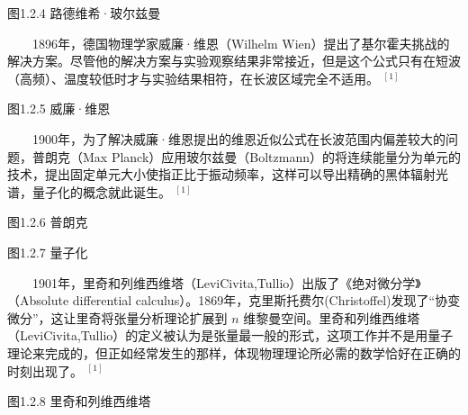 \documentclass[a4paper,11pt,english]{sphinxmanual}
\begin{document}
\begin{center}图1.2.4 路德维希·玻尔兹曼
\end{center}
\sphinxAtStartPar
  1896年，德国物理学家威廉·维恩（Wilhelm Wien）提出了基尔霍夫挑战的解决方案。尽管他的解决方案与实验观察结果非常接近，但是这个公式只有在短波（高频）、温度较低时才与实验结果相符，在长波区域完全不适用。 \(^{[1]}\)


\begin{center}图1.2.5 威廉·维恩
\end{center}
\sphinxAtStartPar
  1900年，为了解决威廉·维恩提出的维恩近似公式在长波范围内偏差较大的问题，普朗克（Max Planck）应用玻尔兹曼（Boltzmann）的将连续能量分为单元的技术，提出固定单元大小使指正比于振动频率，这样可以导出精确的黑体辐射光谱，量子化的概念就此诞生。 \(^{[1]}\)


\begin{center}图1.2.6 普朗克
\end{center}

\begin{center}图1.2.7 量子化
\end{center}
\sphinxAtStartPar
  1901年，里奇和列维\sphinxhyphen{}西维塔（Levi\sphinxhyphen{}Civita,Tullio）出版了《绝对微分学》（Absolute differential calculus）。1869年，克里斯托费尔(Christoffel)发现了“协变微分”，这让里奇将张量分析理论扩展到 \(n\) 维黎曼空间。里奇和列维\sphinxhyphen{}西维塔（Levi\sphinxhyphen{}Civita,Tullio）的定义被认为是张量最一般的形式，这项工作并不是用量子理论来完成的，但正如经常发生的那样，体现物理理论所必需的数学恰好在正确的时刻出现了。 \(^{[1]}\)


\begin{center}图1.2.8 里奇和列维\sphinxhyphen{}西维塔
\end{center}
\end{document}
